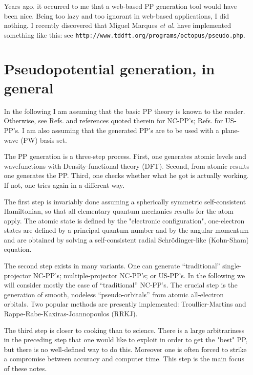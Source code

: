 Years ago, it occurred to me that a web-based PP generation
tool would have been nice. Being too lazy and too ignorant 
in web-based applications, I did nothing. 
I recently discovered that Miguel Marques {\em et al.} have
implemented something like this: see
{\tt http://www.tddft.org/programs/octopus/pseudo.php}.

\section{Pseudopotential generation, in general} 

In the following I am assuming that the basic PP theory 
is known to the reader. Otherwise, see 
Refs.\cite{NC,BHS,TM,fhi98PP,RRKJ} and references quoted 
therein for NC-PP's; Refs.\cite{van,PAW} for US-PP's. 
I am also assuming that the generated PP's are to be used
with a plane-wave (PW) basis set.

The PP generation is a three-step process. First, one generates
atomic levels and wavefunctions with Density-functional theory (DFT). 
Second, from atomic results one generates the PP. Third, one checks 
whether what he got is actually working. If not, one tries again in 
a different way.

The first step is invariably done assuming a spherically symmetric
self-consistent Hamiltonian, so that all elementary quantum mechanics 
results for the atom apply. The atomic state is defined by the
"electronic configuration", one-electron states are defined by a
principal quantum number and by the angular momentum and are obtained
by solving a self-consistent radial Schr\"odinger-like (Kohn-Sham)
equation.

The second step exists in many variants. One can generate ``traditional'' 
single-projector NC-PP's; multiple-projector NC-PP's; or US-PP's.
In the following we will consider mostly the case of ``traditional'' 
NC-PP's. The crucial step is the generation of smooth, nodeless
``pseudo-orbitals'' from atomic all-electron orbitals. Two popular 
methods are presently implemented: Troullier-Martins \cite{TM}
and Rappe-Rabe-Kaxiras-Joannopoulos \cite{RRKJ} (RRKJ).

The third step is closer to cooking than to science. There is a
large arbitrariness in the preceding step that one would like to 
exploit in order to get the "best" PP, but there is no well-defined
way to do this. Moreover one is often forced to strike a compromise
between accuracy and computer time. This step is the main focus of
these notes.

